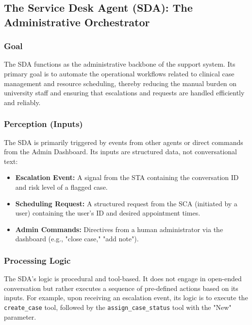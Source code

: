 \subsection{The Service Desk Agent (SDA): The Administrative Orchestrator}

\subsubsection{Goal}
The SDA functions as the administrative backbone of the support system. Its primary goal is to automate the operational workflows related to clinical case management and resource scheduling, thereby reducing the manual burden on university staff and ensuring that escalations and requests are handled efficiently and reliably.

\subsubsection{Perception (Inputs)}
The SDA is primarily triggered by events from other agents or direct commands from the Admin Dashboard. Its inputs are structured data, not conversational text:
\begin{itemize}
    \item \textbf{Escalation Event:} A signal from the STA containing the conversation ID and risk level of a flagged case.
    \item \textbf{Scheduling Request:} A structured request from the SCA (initiated by a user) containing the user's ID and desired appointment times.
    \item \textbf{Admin Commands:} Directives from a human administrator via the dashboard (e.g., "close case," "add note").
\end{itemize}

\subsubsection{Processing Logic}
The SDA's logic is procedural and tool-based. It does not engage in open-ended conversation but rather executes a sequence of pre-defined actions based on its inputs. For example, upon receiving an escalation event, its logic is to execute the \texttt{create\_case} tool, followed by the \texttt{assign\_case\_status} tool with the "New" parameter.

